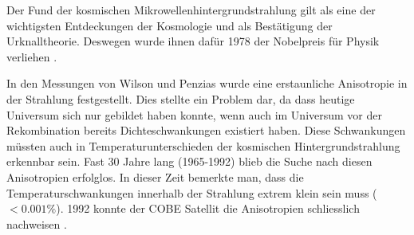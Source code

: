 Der Fund der kosmischen Mikrowellenhintergrundstrahlung gilt als eine der wichtigsten Entdeckungen der Kosmologie und als 
Bestätigung der Urknalltheorie.
Deswegen wurde ihnen dafür 1978 der Nobelpreis für Physik verliehen 
\cite{cmb:dicke}.

In den Messungen von Wilson und Penzias wurde eine erstaunliche Anisotropie in 
der Strahlung festgestellt.
Dies stellte ein Problem dar, da dass heutige Universum sich nur gebildet haben 
konnte, wenn auch im Universum vor der Rekombination bereits Dichteschwankungen 
existiert haben.
Diese Schwankungen müssten auch in Temperaturunterschieden der kosmischen 
Hintergrundstrahlung erkennbar sein.
Fast 30 Jahre lang (1965-1992) blieb die Suche nach diesen Anisotropien 
erfolglos.
In dieser Zeit bemerkte man, dass die Temperaturschwankungen innerhalb der 
Strahlung extrem klein sein muss ($< 0.001\%$).
1992 konnte der \ac{COBE} Satellit die Anisotropien schliesslich nachweisen
\cite{cmb:m_schoenitzer}.

